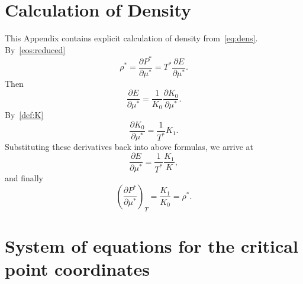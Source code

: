 \documentclass[12pt]{article}
\numberwithin{equation}{section}
\begin{document}
	\pagebreak	
		
	\section{\label{sec:app:dens} Calculation of Density}
	This Appendix contains explicit calculation of density from~\eqref{eq:dens}. By~\eqref{eos:reduced}
	\begin{equation}
		\rho^* = \frac{\partial P^*}{\partial \mu^*} = T^* \frac{\partial E}{\partial \mu^*}.
	\end{equation}
	Then
	\begin{equation}
		\frac{\partial E}{\partial \mu^*} = \frac{1}{K_0} \frac{\partial K_0}{\partial \mu^*}.
	\end{equation}
	By~\eqref{def:K}
	\begin{equation}
		\frac{\partial K_0}{\partial \mu^*} = \frac{1}{T^*}K_1.
	\end{equation}
	Substituting these derivatives back into above formulas, we arrive at
	\begin{equation}
		\frac{\partial E}{\partial \mu^*} = \frac{1}{T^*} \frac{K_1}{K},
	\end{equation}
	and finally
	\begin{equation}
		\left(\frac{\partial P^*}{\partial \mu^*} \right)_T = \frac{K_1}{K_0} = \rho^*.
	\end{equation}
	
	\section{\label{sec:app:cp} System of equations for the critical point coordinates}
	
	
\end{document}
